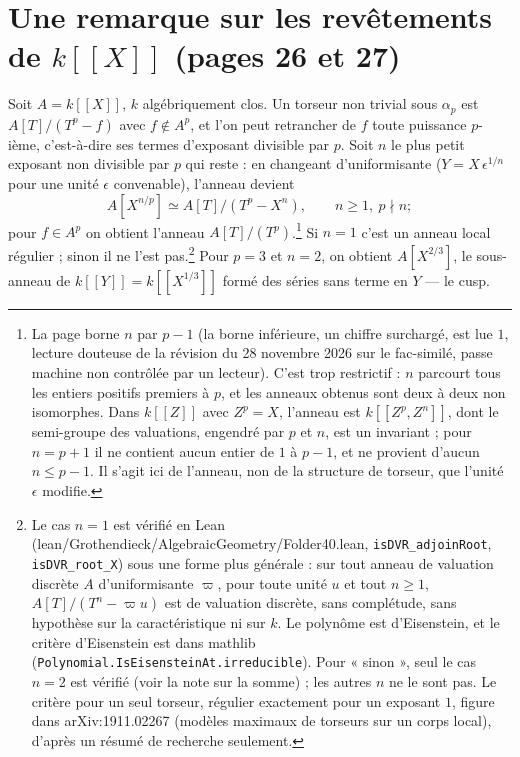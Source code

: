 \documentclass[11pt,a4paper]{article}
\begin{document}
\section*{Une remarque sur les revêtements de $k[[X]]$ (pages 26 et 27)}

Soit $A = k[[X]]$, $k$ algébriquement clos. Un torseur non trivial sous
$\alpha_p$ est $A[T]/(T^p - f)$ avec $f \notin A^p$, et l'on peut retrancher
de $f$ toute puissance $p$-ième, c'est-à-dire ses termes d'exposant divisible
par $p$. Soit $n$ le plus petit exposant non divisible par $p$ qui reste : en
changeant d'uniformisante ($Y = X\,\epsilon^{1/n}$ pour une unité $\epsilon$
convenable), l'anneau devient
\[
A[X^{n/p}] \simeq A[T]/(T^p - X^n), \qquad n \ge 1,\ p \nmid n ;
\]
pour $f \in A^p$ on obtient l'anneau $A[T]/(T^p)$.\footnote{La page borne $n$
par $p - 1$ (la borne inférieure, un chiffre surchargé, est lue $1$, lecture
douteuse de la révision du 28 novembre 2026 sur le fac-similé, passe machine
non contrôlée par un lecteur). C'est trop restrictif :
$n$ parcourt tous les entiers positifs premiers à $p$, et les anneaux obtenus
sont deux à deux non isomorphes. Dans $k[[Z]]$ avec $Z^p = X$, l'anneau est
$k[[Z^p, Z^n]]$, dont le semi-groupe des valuations, engendré par $p$ et $n$,
est un invariant ; pour $n = p+1$ il ne contient aucun entier de $1$ à
$p - 1$, et ne provient d'aucun $n \le p-1$. Il s'agit ici de l'anneau, non
de la structure de torseur, que l'unité $\epsilon$ modifie.} Si $n = 1$ c'est
un anneau local régulier ; sinon il ne l'est pas.\footnote{Le cas $n = 1$ est
vérifié en Lean (lean/Grothendieck/AlgebraicGeometry/Folder40.lean, \texttt{isDVR\_adjoinRoot},
\texttt{isDVR\_root\_X}) sous une forme plus générale : sur tout anneau de
valuation discrète $A$ d'uniformisante $\varpi$, pour toute unité $u$ et tout
$n \geq 1$, $A[T]/(T^n - \varpi u)$ est de valuation discrète, sans
complétude, sans hypothèse sur la caractéristique ni sur $k$. Le polynôme est
d'Eisenstein, et le critère d'Eisenstein est dans mathlib
(\texttt{Polynomial.IsEisensteinAt.irreducible}). Pour « sinon », seul le cas
$n = 2$ est vérifié (voir la note sur la somme) ; les autres $n$ ne le sont
pas. Le critère pour un seul torseur, régulier exactement pour un exposant
$1$, figure dans arXiv:1911.02267 (modèles maximaux de torseurs sur un corps
local), d'après un résumé de recherche seulement.} Pour $p = 3$ et $n = 2$, on
obtient $A[X^{2/3}]$, le sous-anneau de $k[[Y]] = k[[X^{1/3}]]$ formé des
séries sans terme en $Y$ --- le cusp.
\end{document}
